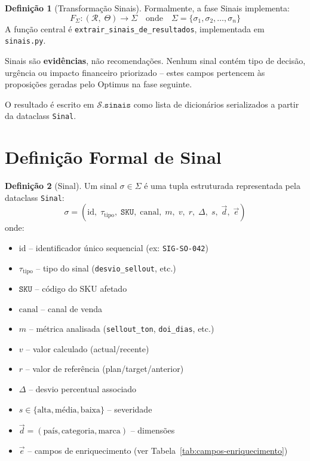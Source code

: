 \documentclass[a4paper, 12pt]{report}
\theoremstyle{definition}
\newtheorem{definicao}{Defini\c{c}\~ao}[chapter]
\theoremstyle{remark}
\newcommand{\sku}{\texttt{SKU}}
\newcommand{\state}{\mathcal{S}}
\begin{document}
\begin{definicao}[Transforma\c{c}\~ao Sinais]
  Formalmente, a fase Sinais implementa:
  \[
    F_{\Sigma} : (\mathcal{R},\; \Theta) \to \Sigma
    \quad \text{onde} \quad
    \Sigma = \{\sigma_1, \sigma_2, \ldots, \sigma_n\}
  \]
  A fun\c{c}\~ao central \'e \texttt{extrair\_sinais\_de\_resultados},
  implementada em \texttt{sinais.py}.
\end{definicao}

\begin{caixadecisao}
  Sinais s\~ao \textbf{evid\^encias}, n\~ao recomenda\c{c}\~oes.
  Nenhum sinal cont\'em tipo de decis\~ao, urg\^encia ou impacto
  financeiro priorizado -- estes campos pertencem \`as proposi\c{c}\~oes
  geradas pelo Optimus na fase seguinte.
\end{caixadecisao}

O resultado \'e escrito em $\state.\texttt{sinais}$ como lista de
dicion\'arios serializados a partir da dataclass \texttt{Sinal}.


\section{Defini\c{c}\~ao Formal de Sinal}

\begin{definicao}[Sinal]
  Um sinal $\sigma \in \Sigma$ \'e uma tupla estruturada representada
  pela dataclass \texttt{Sinal}:
  \[
    \sigma = (\text{id},\; \tau_{\text{tipo}},\; \sku,\; \text{canal},\; m,\;
              v,\; r,\; \Delta,\; s,\; \vec{d},\; \vec{e})
  \]
  onde:
  \begin{itemize}
    \item $\text{id}$ -- identificador \'unico sequencial (ex: \texttt{SIG-SO-042})
    \item $\tau_{\text{tipo}}$ -- tipo do sinal (\texttt{desvio\_sellout}, etc.)
    \item $\sku$ -- c\'odigo do SKU afetado
    \item $\text{canal}$ -- canal de venda
    \item $m$ -- m\'etrica analisada (\texttt{sellout\_ton}, \texttt{doi\_dias}, etc.)
    \item $v$ -- valor calculado (actual/recente)
    \item $r$ -- valor de refer\^encia (plan/target/anterior)
    \item $\Delta$ -- desvio percentual associado
    \item $s \in \{\text{alta}, \text{m\'edia}, \text{baixa}\}$ -- severidade
    \item $\vec{d} = (\text{pa\'is}, \text{categoria}, \text{marca})$ -- dimens\~oes
    \item $\vec{e}$ -- campos de enriquecimento (ver Tabela~\ref{tab:campos-enriquecimento})
  \end{itemize}
\end{definicao}
\end{document}
